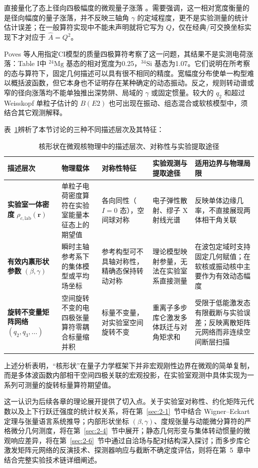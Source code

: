 直接量化了态上径向四极幅度的微观量子涨落 \cite{poves-2020-limits-assigning-nuclear-shape}。需要强调，这一相对宽度衡量的是径向幅度的量子涨落，并不反映三轴角 $\gamma$ 的定域程度，更不是实验测量的统计估计误差；在一般算符实现中不能未声明就将它写为 $Q$，仅在经典/可交换坐标实现下才对应于 $\hat{A} = Q^2$。

Poves 等人用指定CI模型的质量四极算符考察了这一问题，其结果不是实测电荷涨落：Table I中 $^{24}\mathrm{Mg}$ 基态的相对宽度为0.25，$^{34}\mathrm{Si}$ 基态为1.07。它们说明在所考察的态与算符下，固定几何描述可以具有很不相同的精度。宽幅度分布使单一构型难以概括波函数，但它本身也不证明存在某种确定的动态振动。反之，规则转动谱或窄的径向涨落均不能单独推出深势阱、局域的 $\gamma$ 或固定惯量。较大的 $q_2$ 和超过 Weisskopf 单粒子估计的 $B(E2)$ 也可出现在振动、组态混合或软核模型中，须结合其它观测解释。

表~\ref{tab:1-2-shape-hierarchy}辨析了本节讨论的三种不同描述层次及其特征：

\begin{table}[htbp]
\centering
\small
\caption{核形状在微观核物理中的描述层次、对称性与实验提取途径}\label{tab:1-2-shape-hierarchy}
\begin{tabularx}{\textwidth}{p{2.6cm}p{3.0cm}p{2.6cm}p{2.8cm}X}
\toprule
描述层次 & 物理载体 & 对称性特征 & 实验观测与提取途径 & 适用边界与物理局限 \\
\midrule
\textbf{实验室一体密度} $\rho_{c, \text{lab}}(\mathbf{r})$ & 单粒子电荷密度算符在实验室能量本征态上的期望值 & 各向同性（$I=0$ 态），空间球对称 & 电子弹性散射、缪子 X 射线光谱 & 反映单体边缘几率，不直接展现两体相干角关联 \\
\textbf{有效内禀形状参数} $(\beta, \gamma)$ & 瞬时主轴参考系下的集体模型或平均场坐标 & 参考构型可不具轴对称性，精确态保持转动对称 & 理论模型映射参量，无法在实验室系直接测量 & 在波包定域时支持固定几何赋值；在软核或振动核中主要作为有效动态幅度 \\
\textbf{旋转不变量矩阵网络} $(q_2, q_3, \dots)$ & 空间旋转不变的电四极张量算符零耦合标量缩并积 & 标量不变量，对实验室空间旋转不变 & 重离子多步库仑激发多体跃迁与对角矩求和 & 受限于低能激发态有限截断与实验误差；反映离散矩阵元网络而非连续空间断层扫描 \\
\bottomrule
\end{tabularx}
\end{table}

上述分析表明，“核形状”在量子力学框架下并非宏观刚性边界在微观的简单复制，而是多体波函数内部相干空间四极关联的宏观投影，在实验室观测中具体实现为一系列可测量的旋转标量算符期望值。

这一认识为后续各章的理论展开提供了切入点。关于实验室对称性、约化矩阵元代数以及上下行跃迁强度的统计权关系，将在第~\ref{sec:2-1}~节中结合 Wigner--Eckart 定理与张量语言系统推导；内部形状坐标 $(\beta, \gamma)$、度规张量与动能微分算符的严格微分几何测度，将在第~\ref{sec:2-4}~节中展开；静态几何形变与集体转动惯量的微观响应差异，将在第~\ref{sec:2-6}~节中通过自洽场与配对结构深入探讨；而多步库仑激发矩阵元网络的反演技术、探测器响应与截断不确定度评估，则将在第~5~章中结合完整实验技术链详细阐述。
